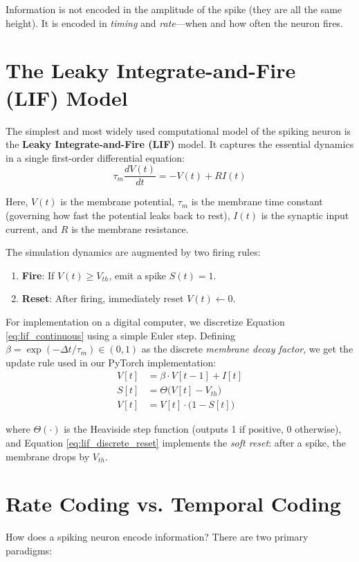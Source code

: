 \documentclass[12pt]{article}
\begin{document}
Information is not encoded in the amplitude of the spike (they are all the same height). It is encoded in \textit{timing} and \textit{rate}—when and how often the neuron fires.

\section*{The Leaky Integrate-and-Fire (LIF) Model}
The simplest and most widely used computational model of the spiking neuron is the \textbf{Leaky Integrate-and-Fire (LIF)} model. It captures the essential dynamics in a single first-order differential equation:
\begin{equation}
    \tau_m \frac{dV(t)}{dt} = -V(t) + RI(t)
    \label{eq:lif_continuous}
\end{equation}

Here, $V(t)$ is the membrane potential, $\tau_m$ is the membrane time constant (governing how fast the potential leaks back to rest), $I(t)$ is the synaptic input current, and $R$ is the membrane resistance.

The simulation dynamics are augmented by two firing rules:
\begin{enumerate}
    \item \textbf{Fire}: If $V(t) \geq V_{th}$, emit a spike $S(t) = 1$.
    \item \textbf{Reset}: After firing, immediately reset $V(t) \leftarrow 0$.
\end{enumerate}

For implementation on a digital computer, we discretize Equation \ref{eq:lif_continuous} using a simple Euler step. Defining $\beta = \exp(-\Delta t / \tau_m) \in (0, 1)$ as the discrete \textit{membrane decay factor}, we get the update rule used in our PyTorch implementation:
\begin{align}
    V[t] &= \beta \cdot V[t-1] + I[t] \label{eq:lif_discrete_integrate} \\
    S[t] &= \Theta\bigl(V[t] - V_{th}\bigr) \label{eq:lif_discrete_fire} \\
    V[t] &= V[t] \cdot \bigl(1 - S[t]\bigr) \label{eq:lif_discrete_reset}
\end{align}

where $\Theta(\cdot)$ is the Heaviside step function (outputs 1 if positive, 0 otherwise), and Equation \ref{eq:lif_discrete_reset} implements the \textit{soft reset}: after a spike, the membrane drops by $V_{th}$.

\section*{Rate Coding vs. Temporal Coding}
How does a spiking neuron encode information? There are two primary paradigms:
\end{document}
